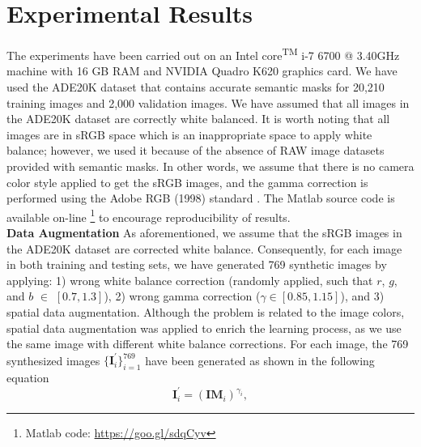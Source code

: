 \documentclass[sigplan]{acmart}
\begin{document}
\begin{table}[]
\centering
\caption{The average root mean square error for the testing set of the ADE20K dataset using AlexNet with and without semantic information. The first row shows the results of using images that have no gamma correction required ($\gamma = 1$). While the second row shows the results obtained using the entire testing set.}
\end{table}





\section{Experimental Results}
The experiments have been carried out on an Intel\textsuperscript{\textregistered} core\textsuperscript{TM} i-7 6700 @ 3.40GHz machine with 16 GB RAM and NVIDIA\textsuperscript{\textregistered} Quadro K620 graphics card. We have used the ADE20K dataset \cite{ade20k} that contains accurate semantic masks for 20,210 training images and 2,000 validation images. We have assumed that all images in the ADE20K dataset are correctly white balanced. It is worth noting that all images are in sRGB space which is an inappropriate space to apply white balance; however, we used it because of the absence of RAW image datasets provided with semantic masks. In other words, we assume that there is no camera color style applied to get the sRGB images, and the gamma correction is performed using the Adobe RGB (1998) standard \cite{headquarters2005adobe}. The Matlab source code is available on-line \footnote{Matlab code: \hyperlink{https://goo.gl/sdqCyv}{https://goo.gl/sdqCyv}} to encourage reproducibility of results. 
\\
\textbf{Data Augmentation}
As aforementioned, we assume that the sRGB images in the ADE20K dataset are corrected white balance. Consequently, for each image in both training and testing sets, we have generated 769 synthetic images by applying: 1) wrong white balance correction (randomly applied, such that $r$, $g$, and $b$ $\in$ $[0.7, 1.3]$), 2) wrong gamma correction ($\gamma \in [0.85,1.15]$), and 3) spatial data augmentation. Although the problem is related to the image colors, spatial data augmentation was applied to enrich the learning process, as we use the same image with different white balance corrections. For each image, the 769 synthesized images $\{\mathbf{I}_i^{'}\}_{i=1}^{769}$ have been generated as shown in the following equation
\begin{equation}
\mathbf{I}_i^{'} = (\mathbf{I}\mathbf{M}_i)^{\gamma_i},
\end{equation}
\end{document}

